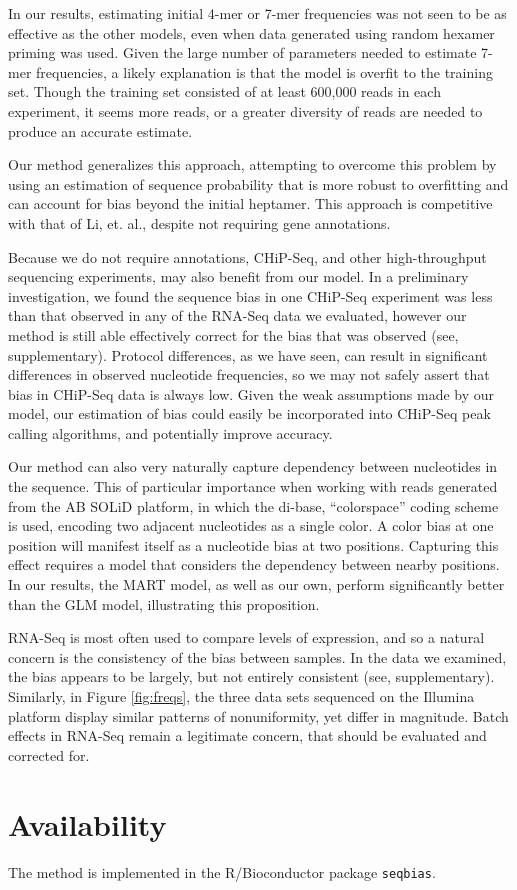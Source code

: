 \documentclass{bioinfo}
\begin{document}
In our results, estimating initial 4-mer or 7-mer frequencies was not seen to be
as effective as the other models, even when data generated using random hexamer
priming was used. Given the large number of parameters needed to estimate 7-mer
frequencies, a likely explanation is that the model is overfit to the training
set. Though the training set consisted of at least 600,000 reads in
each experiment, it seems more reads, or a greater diversity of reads are needed
to produce an accurate estimate.

Our method generalizes this approach, attempting to overcome this problem by
using an estimation of sequence probability that is more robust to overfitting
and can account for bias beyond the initial heptamer. This approach is
competitive with that of Li, et. al., despite not requiring gene annotations.

Because we do not require annotations, CHiP-Seq, and other high-throughput
sequencing experiments, may also benefit from our model. In a preliminary
investigation, we found the sequence bias in one CHiP-Seq experiment
\cite{Cao2010} was less than that observed in any of the RNA-Seq data we
evaluated, however our method is still able effectively correct for the bias
that was observed (see, supplementary). Protocol differences, as we have seen,
can result in significant differences in observed nucleotide frequencies, so we
may not safely assert that bias in CHiP-Seq data is always low.  Given the weak
assumptions made by our model, our estimation of bias could easily be
incorporated into CHiP-Seq peak calling algorithms, and potentially improve
accuracy.

Our method can also very naturally capture dependency between nucleotides in the
sequence. This of particular importance when working with reads generated from
the AB SOLiD platform, in which the di-base, ``colorspace'' coding scheme is
used, encoding two adjacent nucleotides as a single color. A color bias at one
position will manifest itself as a nucleotide bias at two positions. Capturing
this effect requires a model that considers the dependency between nearby
positions. In our results, the MART model, as well as our own, perform
significantly better than the GLM model, illustrating this proposition.

RNA-Seq is most often used to compare levels of expression, and so a natural
concern is the consistency of the bias between samples. In the data we examined,
the bias appears to be largely, but not entirely consistent (see,
supplementary). Similarly, in Figure \ref{fig:freqs}, the three data sets
sequenced on the Illumina platform display similar patterns of nonuniformity,
yet differ in magnitude. Batch effects in RNA-Seq remain a legitimate concern,
that should be evaluated and corrected for.

\section{Availability}

The method is implemented in the R/Bioconductor \cite{Gentleman2004} package \texttt{seqbias}.




\end{document}
